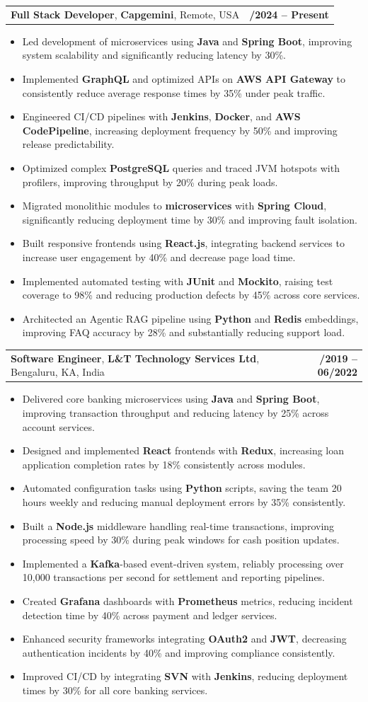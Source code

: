 \documentclass[letterpaper,11pt]{article}
\makeatletter
\newcommand{\resumeItem}[1]{
  \item\footnotesize{
    {#1 \vspace{-2pt}}
  }
}
\newcommand{\resumeSubheading}[4]{
  \vspace{-2pt}\item
    \begin{tabular*}{1.0\textwidth}[t]{l@{\extracolsep{\fill}}r}
      \textbf{\fontsize{10pt}{14pt}\selectfont #3}, \textbf{\fontsize{10pt}{14pt}\selectfont #1}, \fontsize{10pt}{14pt}\selectfont #4 & \textbf{\fontsize{10pt}{14pt}\selectfont #2} \\
    \end{tabular*}\vspace{-7pt}
}
\newcommand{\resumeItemListStart}{\begin{itemize}[leftmargin=*]}
\newcommand{\resumeItemListEnd}{\end{itemize}\vspace{-5pt}}
\makeatother
\begin{document}
    \resumeSubheading
        {Capgemini}{01/2024 -- Present}
        {Full Stack Developer}{Remote, USA}
      \resumeItemListStart
        \resumeItem{Led development of microservices using \textbf{Java} and \textbf{Spring Boot}, improving system scalability and significantly reducing latency by 30\%.}
        \resumeItem{Implemented \textbf{GraphQL} and optimized APIs on \textbf{AWS API Gateway} to consistently reduce average response times by 35\% under peak traffic.}
        \resumeItem{Engineered CI/CD pipelines with \textbf{Jenkins}, \textbf{Docker}, and \textbf{AWS CodePipeline}, increasing deployment frequency by 50\% and improving release predictability.}
        \resumeItem{Optimized complex \textbf{PostgreSQL} queries and traced JVM hotspots with profilers, improving throughput by 20\% during peak loads.}
        \resumeItem{Migrated monolithic modules to \textbf{microservices} with \textbf{Spring Cloud}, significantly reducing deployment time by 30\% and improving fault isolation.}
        \resumeItem{Built responsive frontends using \textbf{React.js}, integrating backend services to increase user engagement by 40\% and decrease page load time.}
        \resumeItem{Implemented automated testing with \textbf{JUnit} and \textbf{Mockito}, raising test coverage to 98\% and reducing production defects by 45\% across core services.}
        \resumeItem{Architected an Agentic RAG pipeline using \textbf{Python} and \textbf{Redis} embeddings, improving FAQ accuracy by 28\% and substantially reducing support load.}
      \resumeItemListEnd

    \resumeSubheading
        {L\&T Technology Services Ltd}{08/2019 -- 06/2022}
        {Software Engineer}{Bengaluru, KA, India}
      \resumeItemListStart
        \resumeItem{Delivered core banking microservices using \textbf{Java} and \textbf{Spring Boot}, improving transaction throughput and reducing latency by 25\% across account services.}
        \resumeItem{Designed and implemented \textbf{React} frontends with \textbf{Redux}, increasing loan application completion rates by 18\% consistently across modules.}
        \resumeItem{Automated configuration tasks using \textbf{Python} scripts, saving the team 20 hours weekly and reducing manual deployment errors by 35\% consistently.}
        \resumeItem{Built a \textbf{Node.js} middleware handling real-time transactions, improving processing speed by 30\% during peak windows for cash position updates.}
        \resumeItem{Implemented a \textbf{Kafka}-based event-driven system, reliably processing over 10,000 transactions per second for settlement and reporting pipelines.}
        \resumeItem{Created \textbf{Grafana} dashboards with \textbf{Prometheus} metrics, reducing incident detection time by 40\% across payment and ledger services.}
        \resumeItem{Enhanced security frameworks integrating \textbf{OAuth2} and \textbf{JWT}, decreasing authentication incidents by 40\% and improving compliance consistently.}
        \resumeItem{Improved CI/CD by integrating \textbf{SVN} with \textbf{Jenkins}, reducing deployment times by 30\% for all core banking services.}
      \resumeItemListEnd
\end{document}

